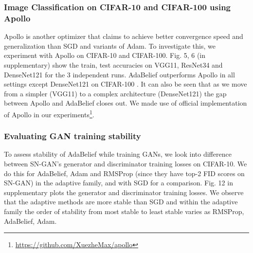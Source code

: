 \subsubsection{Image Classification on CIFAR-10 and CIFAR-100 using Apollo}
Apollo \cite{Apollo} is another optimizer that claims to achieve better convergence speed and generalization than SGD and variants of Adam. To investigate this, we experiment with Apollo on CIFAR-10 and CIFAR-100. Fig. 5, 6 (in supplementary) show the train, test accuracies on VGG11, ResNet34 and DenseNet121 for the 3 independent runs. AdaBelief outperforms Apollo in all settings except DenseNet121 on CIFAR-100 . It can also be seen that as we move from a simpler (VGG11) to a complex architecture (DenseNet121) the gap between Apollo and AdaBelief closes out. We made use of official implementation of Apollo in our experiments\footnote{\href{https://github.com/XuezheMax/apollo}{https://github.com/XuezheMax/apollo}}.



\subsubsection{ Evaluating GAN training stability} 
\label{lab:training_stability}
To assess stability of AdaBelief while training GANs, we look into difference between SN-GAN's generator and discriminator training losses on CIFAR-10. We do this for AdaBelief, Adam and RMSProp (since they have top-2 FID scores on SN-GAN) in the adaptive family, and with SGD for a comparison. Fig. 12 in supplementary plots the generator and discriminator training losses. We observe that the adaptive methods are more stable than SGD and within the adaptive family the order of stability from most stable to least stable varies as RMSProp, AdaBelief, Adam.

